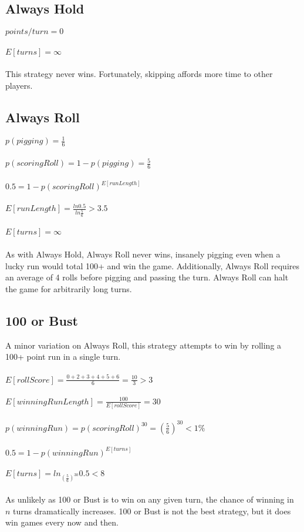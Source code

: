 \documentclass{article}
\begin{document}
\subsection*{Always Hold}
$points/turn = 0$
\\\\
$E[turns] = \infty$
\\\\
This strategy never wins. Fortunately, skipping affords more time to other players.

\subsection*{Always Roll}
$p(pigging) = \frac{1}{6}$
\\\\
$p(scoringRoll) = 1 - p(pigging) = \frac{5}{6}$
\\\\
$0.5 = 1 - p(scoringRoll)^{E[runLength]}$
\\\\
$E[runLength] = \frac{ln 0.5}{ln \frac{5}{6}} > 3.5$
\\\\
$E[turns] = \infty$
\\\\
As with Always Hold, Always Roll never wins, insanely pigging even when a lucky run would total 100+ and win the game. Additionally, Always Roll requires an average of 4 rolls before pigging and passing the turn. Always Roll can halt the game for arbitrarily long turns.

\subsection*{100 or Bust}
A minor variation on Always Roll, this strategy attempts to win by rolling a 100+ point run in a single turn.
\\\\
$E[rollScore] = \frac{0 + 2 + 3 + 4 + 5 + 6}{6} = \frac{10}{3} > 3$
\\\\
$E[winningRunLength] = \frac{100}{E[rollScore]} = 30$
\\\\
$p(winningRun) = p(scoringRoll)^{30} = (\frac{5}{6})^{30} < 1\%$
\\\\
$0.5 = 1 - p(winningRun)^{E[turns]}$
\\\\
$E[turns] = ln_{(\frac{5}{6})^{30}} 0.5 < 8$
\\\\
As unlikely as 100 or Bust is to win on any given turn, the chance of winning in $n$ turns dramatically increases. 100 or Bust is not the best strategy, but it does win games every now and then.
\end{document}

